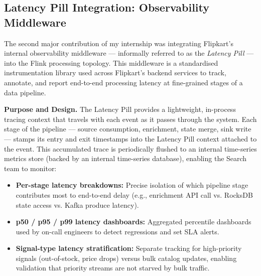 \subsection{Latency Pill Integration: Observability Middleware}
\begin{justify}
    The second major contribution of my internship was integrating Flipkart's internal observability middleware — informally referred to as the \textit{Latency Pill} — into the Flink processing topology. This middleware is a standardised instrumentation library used across Flipkart's backend services to track, annotate, and report end-to-end processing latency at fine-grained stages of a data pipeline.

    \textbf{Purpose and Design.} The Latency Pill provides a lightweight, in-process tracing context that travels with each event as it passes through the system. Each stage of the pipeline — source consumption, enrichment, state merge, sink write — stamps its entry and exit timestamps into the Latency Pill context attached to the event. This accumulated trace is periodically flushed to an internal time-series metrics store (backed by an internal time-series database), enabling the Search team to monitor:
    \begin{itemize}
        \item \textbf{Per-stage latency breakdowns:} Precise isolation of which pipeline stage contributes most to end-to-end delay (e.g., enrichment API call vs. RocksDB state access vs. Kafka produce latency).
        \item \textbf{p50 / p95 / p99 latency dashboards:} Aggregated percentile dashboards used by on-call engineers to detect regressions and set SLA alerts.
        \item \textbf{Signal-type latency stratification:} Separate tracking for high-priority signals (out-of-stock, price drops) versus bulk catalog updates, enabling validation that priority streams are not starved by bulk traffic.
    \end{itemize}


\end{justify}
